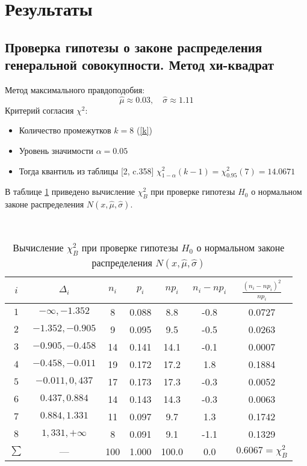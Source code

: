 \documentclass[12pt]{article}
\begin{document}
\section{Результаты}
\subsection{Проверка гипотезы о законе распределения генеральной совокупности. Метод хи-квадрат}
Метод максимального правдоподобия:
\[
    \hat{\mu} \approx 0.03 , \quad \hat{\sigma} \approx 1.11    
\]
Критерий согласия $\chi^2$:\\
\begin{itemize}
    \item Количество промежутков $k=8$ (\ref{k})
    \item Уровень значимости $\alpha = 0.05$
    \item Тогда квантиль из таблицы [2, c.358] $\chi^2_{1-\alpha}(k-1) = \chi^2_{0.95}(7) = 14.0671$
\end{itemize}
В таблице \ref{chinorm} приведено вычисление $\chi^2_B$ при проверке гипотезы $H_0$ о нормальном законе распределения $N(x, \hat{\mu}, \hat{\sigma})$.\\
\begin{table}[h!]
    \begin{center}
        \caption{Вычисление $\chi^2_B$ при проверке гипотезы $H_0$ о нормальном законе распределения $N(x, \hat{\mu}, \hat{\sigma})$}
        \phantom{0}\\
        \begin{tabular}{|c|c|c|c|c|c|c|}\hline
            $i$ & $\Delta_i$ & $n_i$ & $p_i$ & $np_i$ & $n_i - np_i$ & $\frac{(n_i-np_i)^2}{np_i}$\\
            \hline
            $1$ & $-\infty,-1.352$ & 8 & 0.088 & 8.8 & -0.8 & 0.0727\\
            \hline
            $2$ & $-1.352, -0.905$ & 9 & 0.095 & 9.5 & -0.5 & 0.0263\\
            \hline
            $3$ & $-0.905, -0.458$ & 14 & 0.141 & 14.1 & -0.1 & 0.0007\\
            \hline
            $4$ & $-0.458, -0.011$ & 19 & 0.172 & 17.2 & 1.8 & 0.1884\\
            \hline
            $5$ & $-0.011, 0,437$ & 17 & 0.173 & 17.3 & -0.3 & 0.0052\\
            \hline
            $6$ & $0.437, 0.884$ & 14 & 0.143 & 14.3 & -0.3 & 0.0063\\
            \hline
            $7$ & $0.884, 1.331$ & 11 & 0.097 & 9.7 & 1.3 & 0.1742\\
            \hline
            $8$ & $1,331, +\infty$ & 8 & 0.091 & 9.1 & -1.1 & 0.1329\\
            \hline
            $\sum$ & --- & 100 & 1.000 & 100.0 & 0.0 & $0.6067 = \chi^2_B$\\
            \hline
        \end{tabular}
    \label{chinorm}
    \end{center}
\end{table}
\end{document}
